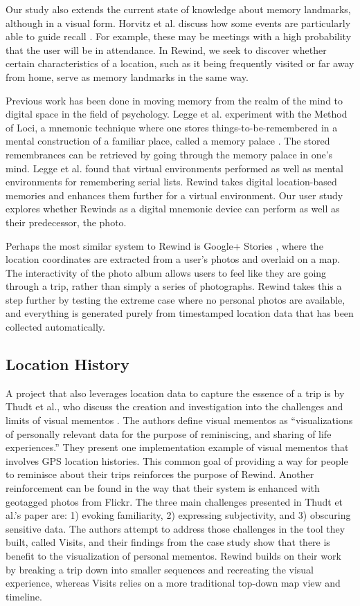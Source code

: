 \documentclass{sigchi}
\begin{document}
Our study also extends the current state of knowledge about memory landmarks, although in a visual form. Horvitz et al. discuss how some events are particularly able to guide recall \cite{horvitz2004learning}. For example, these may be meetings with a high probability that the user will be in attendance. In Rewind, we seek to discover whether certain characteristics of a location, such as it being frequently visited or far away from home, serve as memory landmarks in the same way. 

Previous work has been done in moving memory from the realm of the mind to digital space in the field of psychology. Legge et al. experiment with the Method of Loci, a mnemonic technique where one stores things-to-be-remembered in a mental construction of a familiar place, called a memory palace \cite{legge2012building}. The stored remembrances can be retrieved by going through the memory palace in one's mind. Legge et al. found that virtual environments performed as well as mental environments for remembering serial lists. Rewind takes digital location-based memories and enhances them further for a virtual environment. Our user study explores whether Rewinds as a digital mnemonic device can perform as well as their predecessor, the photo.

Perhaps the most similar system to Rewind is Google+ Stories \cite{googlestories}, where the location coordinates are extracted from a user's photos and overlaid on a map. The interactivity of the photo album allows users to feel like they are going through a trip, rather than simply a series of photographs. Rewind takes this a step further by testing the extreme case where no personal photos are available, and everything is generated purely from timestamped location data that has been collected automatically.

\subsection{Location History}
A project that also leverages location data to capture the essence of a trip is by Thudt et al., who discuss the creation and investigation into the challenges and limits of visual mementos \cite{thudt2016visual}. The authors define visual mementos as ``visualizations of personally relevant data for the purpose of reminiscing, and sharing of life experiences.'' They present one implementation example of visual mementos that involves GPS location histories. This common goal of providing a way for people to reminisce about their trips reinforces the purpose of Rewind. Another reinforcement can be found in the way that their system is enhanced with geotagged photos from Flickr. The three main challenges presented in Thudt et al.'s paper are: 1) evoking familiarity, 2) expressing subjectivity, and 3) obscuring sensitive data. The authors attempt to address those challenges in the tool they built, called Visits, and their findings from the case study show that there is benefit to the visualization of personal mementos. Rewind builds on their work by breaking a trip down into smaller sequences and recreating the visual experience, whereas Visits relies on a more traditional top-down map view and timeline.
\end{document}
